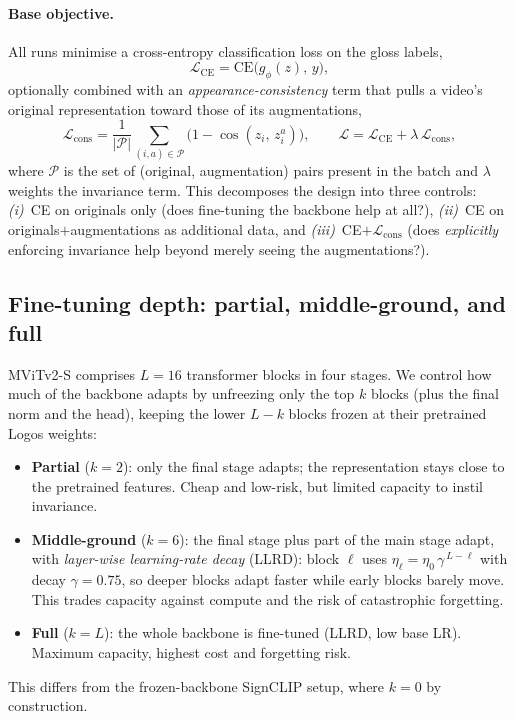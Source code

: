 \paragraph{Base objective.}
All runs minimise a cross-entropy classification loss on the gloss labels,
\begin{equation}
\mathcal{L}_{\mathrm{CE}} = \mathrm{CE}\big(g_\phi(z),\, y\big),
\end{equation}
optionally combined with an \emph{appearance-consistency} term that pulls a video's original
representation toward those of its augmentations,
\begin{equation}
\mathcal{L}_{\mathrm{cons}} =
\frac{1}{|\mathcal{P}|}\!\!\sum_{(i,a)\in\mathcal{P}}\!\!\big(1 - \cos(z_i,\, z_i^{a})\big),
\qquad
\mathcal{L} = \mathcal{L}_{\mathrm{CE}} + \lambda\,\mathcal{L}_{\mathrm{cons}},
\label{eq:base}
\end{equation}
where $\mathcal{P}$ is the set of (original, augmentation) pairs present in the batch and
$\lambda$ weights the invariance term. This decomposes the design into three controls:
\emph{(i)}~CE on originals only (does fine-tuning the backbone help at all?), \emph{(ii)}~CE on
originals${+}$augmentations as additional data, and \emph{(iii)}~CE${+}\mathcal{L}_{\mathrm{cons}}$
(does \emph{explicitly} enforcing invariance help beyond merely seeing the augmentations?).

\subsection{Fine-tuning depth: partial, middle-ground, and full}
\label{sec:unfreeze}
MViTv2-S comprises $L{=}16$ transformer blocks in four stages. We control how much of the
backbone adapts by unfreezing only the top $k$ blocks (plus the final norm and the head),
keeping the lower $L{-}k$ blocks frozen at their pretrained Logos weights:
\begin{itemize}
  \item \textbf{Partial} ($k{=}2$): only the final stage adapts; the representation stays close
  to the pretrained features. Cheap and low-risk, but limited capacity to instil invariance.
  \item \textbf{Middle-ground} ($k{=}6$): the final stage plus part of the main stage adapt,
  with \emph{layer-wise learning-rate decay} (LLRD): block $\ell$ uses
  $\eta_\ell = \eta_0\,\gamma^{\,L-\ell}$ with decay $\gamma{=}0.75$, so deeper blocks adapt
  faster while early blocks barely move. This trades capacity against compute and the risk of
  catastrophic forgetting.
  \item \textbf{Full} ($k{=}L$): the whole backbone is fine-tuned (LLRD, low base LR). Maximum
  capacity, highest cost and forgetting risk.
\end{itemize}
This differs from the frozen-backbone SignCLIP setup, where $k{=}0$ by construction.

